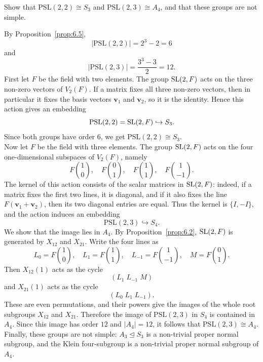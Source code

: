 \documentclass[../Odyssey_Project.tex]{subfiles}
\begin{document}
\begin{exercise}
\label{ex:6.2}
Show that $\mathrm{PSL}(2,2) \cong S_3$ and $\mathrm{PSL}(2,3) \cong A_4$, and that these groups are not simple.
\end{exercise}
\begin{solution}
By Proposition~\ref{prop:6.5},
\[
    \lvert \mathrm{PSL}(2,2)\rvert=2^3-2=6
\]
and
\[
    \lvert \mathrm{PSL}(2,3)\rvert=\frac{3^3-3}{2}=12.
\]
First let $F$ be the field with two elements. The group $\operatorname{SL}(2,F)$ acts on the three non-zero vectors of $V_2(F)$. If a matrix fixes all three non-zero vectors, then in particular it fixes the basis vectors $\mathbf{v}_1$ and $\mathbf{v}_2$, so it is the identity. Hence this action gives an embedding
\[
    \mathrm{PSL}(2,2)=\operatorname{SL}(2,F)\hookrightarrow S_3.
\]
Since both groups have order $6$, we get $\mathrm{PSL}(2,2)\cong S_3$.\\
Now let $F$ be the field with three elements. The group $\operatorname{SL}(2,F)$ acts on the four one-dimensional subspaces of $V_2(F)$, namely
\[
    F\binom{1}{0},\quad
    F\binom{0}{1},\quad
    F\binom{1}{1},\quad
    F\binom{1}{-1}.
\]
The kernel of this action consists of the scalar matrices in $\operatorname{SL}(2,F)$: indeed, if a matrix fixes the first two lines, it is diagonal, and if it also fixes the line $F(\mathbf{v}_1+\mathbf{v}_2)$, then its two diagonal entries are equal. Thus the kernel is $\{I,-I\}$, and the action induces an embedding
\[
    \mathrm{PSL}(2,3)\hookrightarrow S_4.
\]
We show that the image lies in $A_4$. By Proposition~\ref{prop:6.2}, $\operatorname{SL}(2,F)$ is generated by $X_{12}$ and $X_{21}$. Write the four lines as
\[
    L_0=F\binom{1}{0},\quad
    L_1=F\binom{1}{1},\quad
    L_{-1}=F\binom{1}{-1},\quad
    M=F\binom{0}{1}.
\]
Then $X_{12}(1)$ acts as the cycle
\[
    (L_1\;L_{-1}\;M)
\]
and $X_{21}(1)$ acts as the cycle
\[
    (L_0\;L_1\;L_{-1}).
\]
These are even permutations, and their powers give the images of the whole root subgroups $X_{12}$ and $X_{21}$. Therefore the image of $\mathrm{PSL}(2,3)$ in $S_4$ is contained in $A_4$. Since this image has order $12$ and $\lvert A_4\rvert=12$, it follows that $\mathrm{PSL}(2,3)\cong A_4$.\\
Finally, these groups are not simple: $A_3\trianglelefteq S_3$ is a non-trivial proper normal subgroup, and the Klein four-subgroup is a non-trivial proper normal subgroup of $A_4$.
\end{solution}
\end{document}
